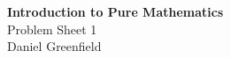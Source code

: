 \documentclass[11pt,a4paper]{article}
\newcommand{\modulename}{Introduction to Pure Mathematics}
\newcommand{\sheetnumber}{1}
\newcommand{\myname}{Daniel Greenfield}
\begin{document}
\begin{center}
  {\Large \textbf{\modulename}}\\[0.3em]
  {\large Problem Sheet \sheetnumber}\\[0.3em]
  \myname
\end{center}
\end{document}

